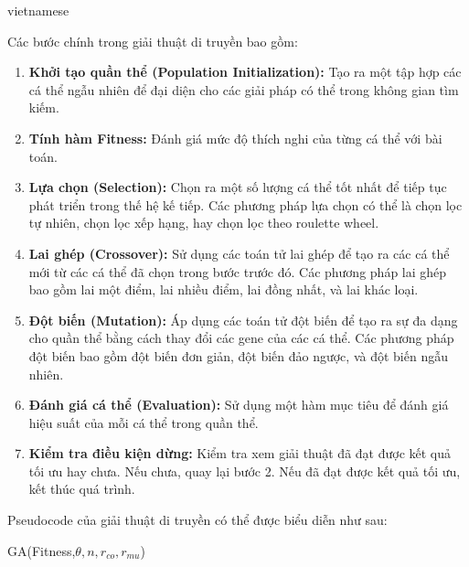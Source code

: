 \documentclass[a4paper]{article}
\begin{document}
\begin{otherlanguage*}{vietnamese}
\begin{enumerate}[leftmargin=7pt]
Các bước chính trong giải thuật di truyền bao gồm:

\begin{enumerate}[leftmargin=7pt]
\item \textbf{Khởi tạo quần thể (Population Initialization):} Tạo ra một tập hợp các cá thể ngẫu nhiên để đại diện cho các giải pháp có thể trong không gian tìm kiếm.

\item \textbf{Tính hàm Fitness:} Đánh giá mức độ thích nghi của từng cá thể với bài toán.

\item \textbf{Lựa chọn (Selection):} Chọn ra một số lượng cá thể tốt nhất để tiếp tục phát triển trong thế hệ kế tiếp. Các phương pháp lựa chọn có thể là chọn lọc tự nhiên, chọn lọc xếp hạng, hay chọn lọc theo roulette wheel.

\item \textbf{Lai ghép (Crossover):} Sử dụng các toán tử lai ghép để tạo ra các cá thể mới từ các cá thể đã chọn trong bước trước đó. Các phương pháp lai ghép bao gồm lai một điểm, lai nhiều điểm, lai đồng nhất, và lai khác loại.

\item \textbf{Đột biến (Mutation):} Áp dụng các toán tử đột biến để tạo ra sự đa dạng cho quần thể bằng cách thay đổi các gene của các cá thể. Các phương pháp đột biến bao gồm đột biến đơn giản, đột biến đảo ngược, và đột biến ngẫu nhiên.

\item \textbf{Đánh giá cá thể (Evaluation):} Sử dụng một hàm mục tiêu để đánh giá hiệu suất của mỗi cá thể trong quần thể.

\item \textbf{Kiểm tra điều kiện dừng:} Kiểm tra xem giải thuật đã đạt được kết quả tối ưu hay chưa. Nếu chưa, quay lại bước 2. Nếu đã đạt được kết quả tối ưu, kết thúc quá trình.

\end{enumerate}

Pseudocode của giải thuật di truyền có thể được biểu diễn như sau:

\begin{algorithm}[H]
GA(Fitness,$\theta,n,r_{co},r_{mu}$)

\end{algorithm}
\end{enumerate}
\end{otherlanguage*}
\end{document}

